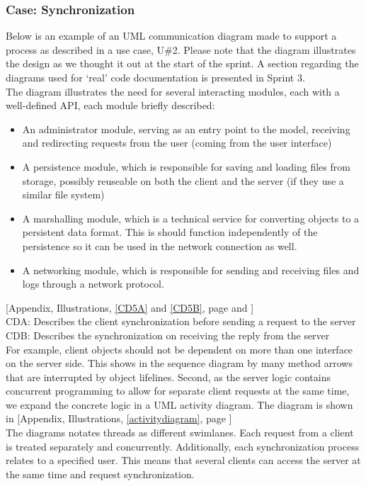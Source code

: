 \subsubsection{Case: Synchronization}
Below is an example of an UML communication diagram made to support a process as described in a use case, U\#2. Please note that the diagram illustrates the design as we thought it out at the start of the sprint. A section regarding the diagrams used for ‘real’ code documentation is presented in Sprint 3. \\
The diagram illustrates the need for several interacting modules, each with a well-defined API, each module briefly described:\\
\begin{itemize}
\item An administrator module, serving as an entry point to the model, receiving and redirecting requests from the user (coming from the user interface)
\item A persistence module, which is responsible for saving and loading files from storage, possibly reuseable on both the client and the server (if they use a similar file system)
\item A marshalling module, which is a technical service for converting objects to a persistent data format. This is should function independently of the persistence so it can be used in the network connection as well.
\item A networking module, which is responsible for sending and receiving files and logs through a network protocol.
\end{itemize}
[Appendix, Illustrations, \ref{CD5A} and \ref{CD5B}, page \pageref{CD5A} and \pageref{CD5B}]\\
\newline
CDA: Describes the client synchronization before sending a request to the server\\
CDB: Describes the synchronization on receiving the reply from the server\\
\newline
For example, client objects should not be dependent on more than one interface on the server side. This shows in the sequence diagram by many method arrows that are interrupted by object lifelines. Second, as the server logic contains concurrent programming to allow for separate client requests at the same time, we expand the concrete logic in a UML activity diagram. The diagram is shown in [Appendix, Illustrations, \ref{activitydiagram}, page \pageref{activitydiagram}]\\
\newline
The diagrams notates threads as different swimlanes. Each request from a client is treated separately and concurrently. Additionally, each synchronization process relates to a specified user. This means that several clients can access the server at the same time and request synchronization.\\
